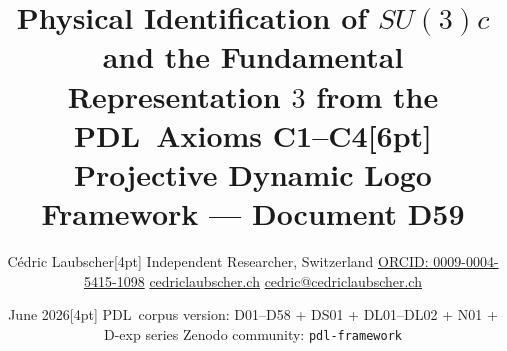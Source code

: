 \documentclass[11pt,a4paper]{article}
\def\\{}%
\def\SUthreec{SU(3)c}%
\def\PDL{PDL}%
\def\mathrm#1{#1}%
\def\mathbf#1{#1}%
\def\textsc#1{#1}%
\theoremstyle{plain}
\theoremstyle{definition}
\theoremstyle{remark}
\newcommand{\PDL}{\textsc{PDL}}
\newcommand{\SUthreec}{\mathrm{SU}(3)_c}
\begin{document}

\title{\textbf{Physical Identification of \texorpdfstring{$\SUthreec$}{SU(3)c}\\
and the Fundamental Representation \texorpdfstring{$\mathbf{3}$}{3}\\
from the \PDL\ Axioms C1--C4}\\[6pt]
{\large Projective Dynamic Logo Framework --- Document D59}}

\author{C\'edric Laubscher\\[4pt]
\small Independent Researcher, Switzerland\\
\small \href{https://orcid.org/0009-0004-5415-1098}{ORCID: 0009-0004-5415-1098}\\
\small \href{https://cedriclaubscher.ch}{cedriclaubscher.ch}\\
\small \href{mailto:cedric@cedriclaubscher.ch}{cedric@cedriclaubscher.ch}}

\date{June 2026\\[4pt]
\small \PDL\ corpus version: D01--D58 + DS01 + DL01--DL02 + N01 + D-exp series\\
\small Zenodo community: \texttt{pdl-framework}}

\maketitle
\end{document}
